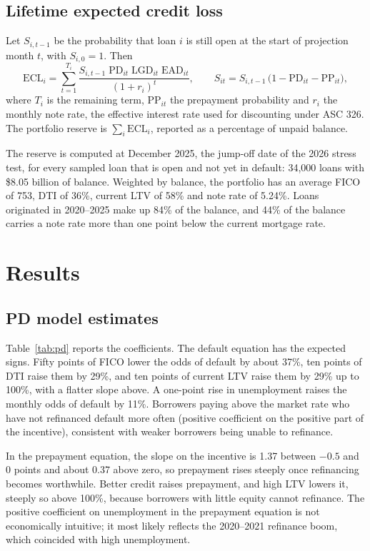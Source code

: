 \documentclass[11pt]{article}
\begin{document}
\subsection{Lifetime expected credit loss}
Let $S_{i,t-1}$ be the probability that loan $i$ is still open at the start of projection month $t$, with
$S_{i,0} = 1$. Then
\[
  \mathrm{ECL}_i = \sum_{t=1}^{T_i} \frac{S_{i,t-1}\;\mathrm{PD}_{it}\;\mathrm{LGD}_{it}\;\mathrm{EAD}_{it}}{(1 + r_i)^t},
  \qquad
  S_{it} = S_{i,t-1}\,\bigl(1 - \mathrm{PD}_{it} - \mathrm{PP}_{it}\bigr),
\]
where $T_i$ is the remaining term, $\mathrm{PP}_{it}$ the prepayment probability and $r_i$ the monthly note rate,
the effective interest rate used for discounting under ASC 326. The portfolio reserve is $\sum_i \mathrm{ECL}_i$,
reported as a percentage of unpaid balance.

The reserve is computed at December 2025, the jump-off date of the 2026 stress test, for every sampled loan that is
open and not yet in default: 34,000 loans with \$8.05 billion of balance. Weighted by balance, the portfolio has an
average FICO of 753, DTI of 36\%, current LTV of 58\% and note rate of 5.24\%. Loans originated in 2020--2025 make up
84\% of the balance, and 44\% of the balance carries a note rate more than one point below the current mortgage rate.

\section{Results}

\subsection{PD model estimates}
Table~\ref{tab:pd} reports the coefficients. The default equation has the expected signs. Fifty points of FICO lower
the odds of default by about 37\%, ten points of DTI raise them by 29\%, and ten points of current LTV raise them by 29\%
up to 100\%, with a flatter slope above. A one-point rise in unemployment raises the monthly odds of default by 11\%.
Borrowers paying above the market rate who have not refinanced default more often (positive coefficient on the
positive part of the incentive), consistent with weaker borrowers being unable to refinance.

In the prepayment equation, the slope on the incentive is 1.37 between $-0.5$ and 0 points and about 0.37 above zero,
so prepayment rises steeply once refinancing becomes worthwhile. Better credit raises prepayment, and high LTV lowers
it, steeply so above 100\%, because borrowers with little equity cannot refinance. The positive coefficient on
unemployment in the prepayment equation is not economically intuitive; it most likely reflects the 2020--2021
refinance boom, which coincided with high unemployment.
\end{document}

